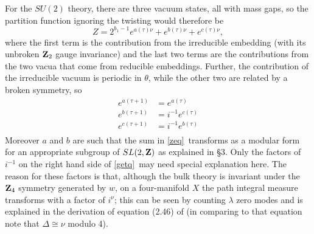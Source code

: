 \documentclass[12pt]{article}
\numberwithin{equation}{section}
\begin{document}
For the $SU(2)$ theory, there are three vacuum states, all with mass gaps,
so the partition function
ignoring the twisting would therefore be
%
\begin{equation}
  \label{zeq}
  Z = 2^{b_1-1}e^{a(\tau)\nu}+e^{b(\tau)\nu}+ e^{c(\tau)\nu},
\end{equation}
%
where the first term is the contribution from the irreducible
embedding (with its unbroken ${\bf Z}_2$ gauge invariance)
and the last two terms are the contributions from
the two vacua that come from reducible embeddings.
Further, the contribution of the irreducible vacuum is periodic
in $\theta$, while the other two are related by a broken symmetry,
so
\begin{equation}
  \label{getq}
  \begin{aligned}e^{a(\tau+1)}&=e^{a(\tau)}
    \\ e^{b(\tau+1)}&=i^{-1}e^{c(\tau)}\\ e^{c(\tau+1)}&=i^{-1}e^{b(\tau)}\\
  \end{aligned}
\end{equation}
Moreover $a$ and $b$ are such that the sum in \eqref{zeq}\ transforms
as a modular form for an appropriate subgroup of $SL(2,{\bf Z})$ as explained
in \S3.  Only the factors of
$i^{-1}$ on the right hand side of \eqref{getq}\ may need special explanation
here.  The reason for these
factors is that, although the bulk theory is invariant under the
${\bf Z}_4$ symmetry generated by $w$, on a four-manifold $X$ the
path integral measure transforms with a factor of $i^\nu$; this
can be seen by counting $\lambda$ zero modes and is explained in the
derivation of equation (2.46) of \cite{switten} (in comparing to that
  equation note that $\Delta\cong\nu$
modulo 4).
\end{document}
